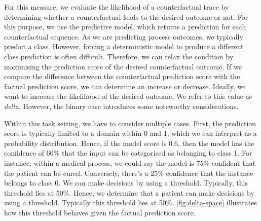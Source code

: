 \documentclass[./../../paper.tex]{subfiles}
\begin{document}
For this measure, we evaluate the likelihood of a counterfactual trace by determining whether a counterfactual leads to the desired outcome or not. For this purpose, we use the predictive model, which returns a prediction for each counterfactual sequence. As we are predicting process outcomes, we typically predict a class. However, forcing a deterministic model to produce a different class prediction is often difficult. Therefore, we can relax the condition by maximising the prediction score of the desired counterfactual outcome\autocite{molnar2019}. If we compare the difference between the counterfactual prediction score with the factual prediction score, we can determine an increase or decrease. Ideally, we want to increase the likelihood of the desired outcome. We refer to this value as \emph{delta}. However, the binary case introduces some noteworthy considerations. 

Within this task setting, we have to consider multiple cases. First, the prediction score is typically limited to a domain within 0 and 1, which we can interpret as a probability distribution. Hence, if the model score is 0.6, then the model has the confidence of 60\% that the input can be categorised as belonging to class 1. For instance, within a medical process, we could say the model is 75\% confident that the patient can be cured. Conversely, there's a 25\%  confidence that the \gls{instance} belongs to class 0. We can make decisions by using a threshold. Typically, this threshold lies at 50\%. Hence, we determine that a patient can make decisions by using a threshold. Typically this threshold lies at 50\%. \autoref{fig:delta-space} illustrates how this threshold behaves given the factual prediction score. 
\end{document}
